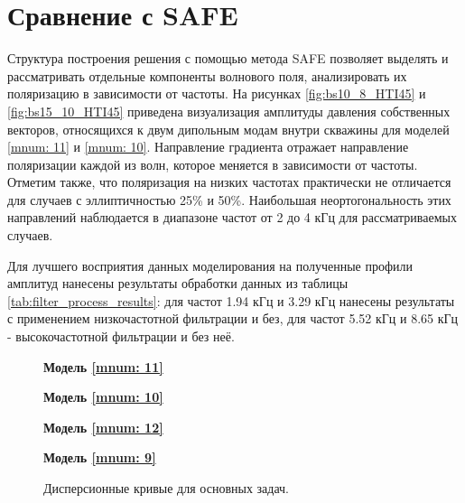\documentclass[a4paper,11pt]{article}
\begin{document}
\section{Сравнение с SAFE}

Структура построения решения с помощью метода SAFE позволяет выделять и рассматривать отдельные компоненты волнового поля, анализировать их поляризацию в зависимости от частоты. На рисунках \ref{fig:bs10_8_HTI45} и \ref{fig:bs15_10_HTI45} приведена визуализация амплитуды давления собственных векторов, относящихся к двум дипольным модам внутри скважины для моделей \ref{mnum: 11} и \ref{mnum: 10}. Направление градиента отражает направление поляризации каждой из волн, которое меняется в зависимости от частоты. Отметим также, что поляризация на низких частотах практически не отличается для случаев с эллиптичностью 25\% и 50\%. Наибольшая неортогональность этих направлений наблюдается в диапазоне частот от 2 до 4 кГц для рассматриваемых случаев. 

Для лучшего восприятия данных моделирования на полученные профили амплитуд нанесены результаты обработки данных из таблицы \ref{tab:filter_process_results}: для частот 1.94 кГц и 3.29 кГц нанесены результаты с применением низкочастотной фильтрации и без, для частот 5.52 кГц и 8.65 кГц - высокочастотной фильтрации и без неё. 

\begin{figure}[h]
\centering
\begin{minipage}{0.49\linewidth}
	\centering \textbf{Модель \ref{mnum: 11}}
	 \\
\end{minipage}
\begin{minipage}{0.49\linewidth}
	\centering \textbf{Модель \ref{mnum: 10}}
	 \\
\end{minipage}
\begin{minipage}{0.49\linewidth}
	\centering \textbf{Модель \ref{mnum: 12}}
	 \\
\end{minipage}
\begin{minipage}{0.49\linewidth}
	\centering \textbf{Модель \ref{mnum: 9}}
	 \\
\end{minipage}
\caption{Дисперсионные кривые для основных задач. }
\label{fig:disp_curves_all}
\end{figure}
\end{document}
